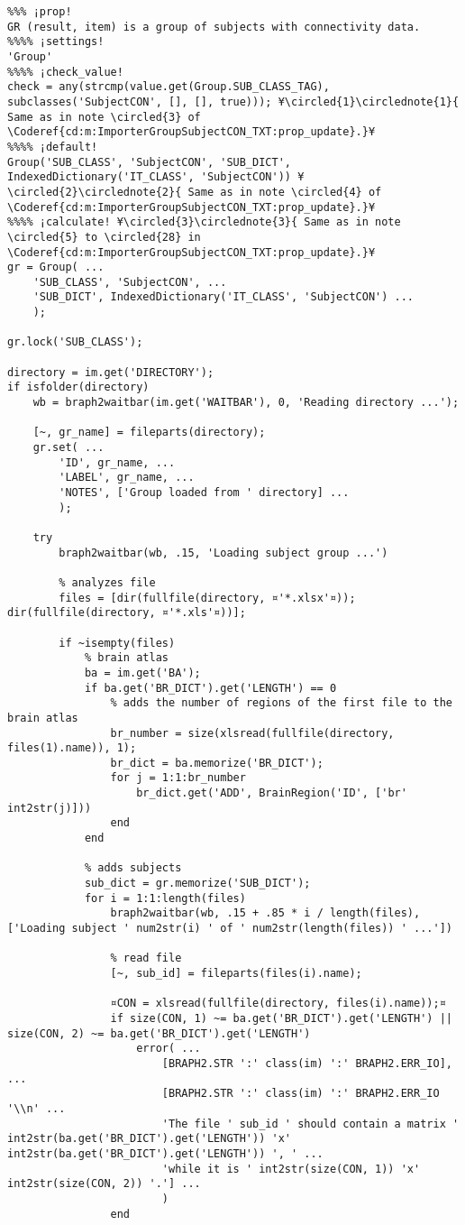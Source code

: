 \documentclass{tufte-handout}
\begin{document}
\begin{lstlisting}
%%% ¡prop!
GR (result, item) is a group of subjects with connectivity data.
%%%% ¡settings!
'Group'
%%%% ¡check_value!
check = any(strcmp(value.get(Group.SUB_CLASS_TAG), subclasses('SubjectCON', [], [], true))); ¥\circled{1}\circlednote{1}{ Same as in note \circled{3} of \Coderef{cd:m:ImporterGroupSubjectCON_TXT:prop_update}.}¥
%%%% ¡default!
Group('SUB_CLASS', 'SubjectCON', 'SUB_DICT', IndexedDictionary('IT_CLASS', 'SubjectCON')) ¥\circled{2}\circlednote{2}{ Same as in note \circled{4} of \Coderef{cd:m:ImporterGroupSubjectCON_TXT:prop_update}.}¥
%%%% ¡calculate! ¥\circled{3}\circlednote{3}{ Same as in note \circled{5} to \circled{28} in \Coderef{cd:m:ImporterGroupSubjectCON_TXT:prop_update}.}¥
gr = Group( ...
    'SUB_CLASS', 'SubjectCON', ...
    'SUB_DICT', IndexedDictionary('IT_CLASS', 'SubjectCON') ...
    );

gr.lock('SUB_CLASS');

directory = im.get('DIRECTORY');
if isfolder(directory)
    wb = braph2waitbar(im.get('WAITBAR'), 0, 'Reading directory ...');
    
    [~, gr_name] = fileparts(directory);
    gr.set( ...
        'ID', gr_name, ...
        'LABEL', gr_name, ...
        'NOTES', ['Group loaded from ' directory] ...
        );

    try
        braph2waitbar(wb, .15, 'Loading subject group ...')
        
        % analyzes file
        files = [dir(fullfile(directory, ¤'*.xlsx'¤)); dir(fullfile(directory, ¤'*.xls'¤))];
        
        if ~isempty(files)
            % brain atlas
            ba = im.get('BA');
            if ba.get('BR_DICT').get('LENGTH') == 0
                % adds the number of regions of the first file to the brain atlas
                br_number = size(xlsread(fullfile(directory, files(1).name)), 1);
                br_dict = ba.memorize('BR_DICT');
                for j = 1:1:br_number
                    br_dict.get('ADD', BrainRegion('ID', ['br' int2str(j)]))
                end
            end

            % adds subjects
            sub_dict = gr.memorize('SUB_DICT');
            for i = 1:1:length(files)
                braph2waitbar(wb, .15 + .85 * i / length(files), ['Loading subject ' num2str(i) ' of ' num2str(length(files)) ' ...'])

                % read file
                [~, sub_id] = fileparts(files(i).name);
                
                ¤CON = xlsread(fullfile(directory, files(i).name));¤
                if size(CON, 1) ~= ba.get('BR_DICT').get('LENGTH') || size(CON, 2) ~= ba.get('BR_DICT').get('LENGTH')
                    error( ...
                        [BRAPH2.STR ':' class(im) ':' BRAPH2.ERR_IO], ...
                        [BRAPH2.STR ':' class(im) ':' BRAPH2.ERR_IO '\\n' ...
                        'The file ' sub_id ' should contain a matrix ' int2str(ba.get('BR_DICT').get('LENGTH')) 'x' int2str(ba.get('BR_DICT').get('LENGTH')) ', ' ...
                        'while it is ' int2str(size(CON, 1)) 'x' int2str(size(CON, 2)) '.'] ...
                        )
                end
                

\end{lstlisting}
\end{document}
